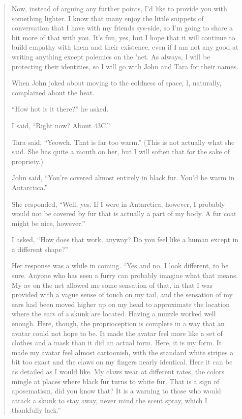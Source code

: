 \begin{quote}
Now, instead of arguing any further points, I'd like to provide you with something lighter. I know that many enjoy the little snippets of conversation that I have with my friends sys-side, so I'm going to share a bit more of that with you. It's fun, yes, but I hope that it will continue to build empathy with them and their existence, even if I am not any good at writing anything except polemics on the 'net. As always, I will be protecting their identities, so I will go with John and Tara for their names.

When John joked about moving to the coldness of space, I, naturally, complained about the heat.

``How hot is it there?'' he asked.

I said, ``Right now? About 43C.''

Tara said, ``Yeowch. That is far too warm.'' (This is not actually what she said. She has quite a mouth on her, but I will soften that for the sake of propriety.)

John said, ``You're covered almost entirely in black fur. You'd be warm in Antarctica.''

She responded, ``Well, yes. If I were in Antarctica, however, I probably would not be covered by fur that is actually a part of my body. A fur coat might be nice, however.''

I asked, ``How does that work, anyway? Do you feel like a human except in a different shape?''

Her response was a while in coming. ``Yes and no. I look different, to be sure. Anyone who has seen a furry can probably imagine what that means. My av on the net allowed me some sensation of that, in that I was provided with a vague sense of touch on my tail, and the sensation of my ears had been moved higher up on my head to approximate the location where the ears of a skunk are located. Having a muzzle worked well enough. Here, though, the proprioception is complete in a way that an avatar could not hope to be. It made the avatar feel more like a set of clothes and a mask than it did an actual form. Here, it is my form. It made my avatar feel almost cartoonish, with the standard white stripes a bit too exact and the claws on my fingers nearly identical. Here it can be as detailed as I would like. My claws wear at different rates, the colors mingle at places where black fur turns to white fur. That is a sign of aposematism, did you know that? It is a warning to those who would attack a skunk to stay away, never mind the scent spray, which I thankfully lack.''


\end{quote}
